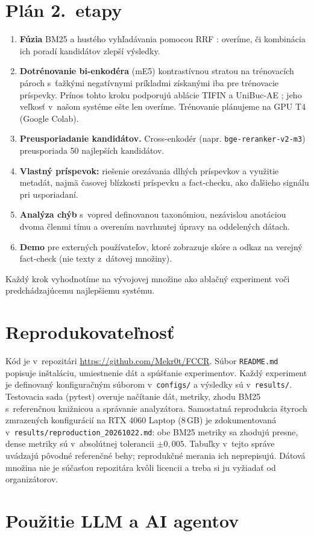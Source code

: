\documentclass[11pt,a4paper]{article}
\begin{document}
\section{Plán 2.~etapy}
\label{sec:plan}

\begin{enumerate}
  \item \textbf{Fúzia} BM25 a hustého vyhľadávania pomocou RRF \citep{cormack-etal-2009-rrf}: overíme, či kombinácia ich poradí kandidátov zlepší výsledky.
  \item \textbf{Dotrénovanie bi-enkodéra} (mE5) kontrastívnou stratou na trénovacích pároch s~ťažkými negatívnymi príkladmi získanými iba pre trénovacie príspevky.
  Prínos tohto kroku podporujú ablácie TIFIN a UniBuc-AE \citep{devadiga-etal-2025-tifin, enache-2025-unibuc}; jeho veľkosť v~našom systéme ešte len overíme.
  Trénovanie plánujeme na GPU T4 (Google Colab).
  \item \textbf{Preusporiadanie kandidátov.} Cross-enkodér (napr. \texttt{bge-\allowbreak reranker-\allowbreak v2-m3}) preusporiada 50 najlepších kandidátov.
  \item \textbf{Vlastný príspevok:} riešenie orezávania dlhých príspevkov a využitie metadát, najmä časovej blízkosti príspevku a fact-checku, ako ďalšieho signálu pri usporiadaní.
  \item \textbf{Analýza chýb} s~vopred definovanou taxonómiou, nezávislou anotáciou dvoma členmi tímu a overením navrhnutej úpravy na oddelených dátach.
  \item \textbf{Demo} pre externých používateľov, ktoré zobrazuje skóre a odkaz na verejný fact-check (nie texty z~dátovej množiny).
\end{enumerate}
Každý krok vyhodnotíme na vývojovej množine ako ablačný experiment voči predchádzajúcemu najlepšiemu systému.

\section{Reprodukovateľnosť}
\label{sec:repro}
Kód je v~repozitári \url{https://github.com/Mekr0t/FCCR}.
Súbor \texttt{README.md} popisuje inštaláciu, umiestnenie dát a spúšťanie experimentov.
Každý experiment je definovaný konfiguračným súborom v~\texttt{configs/} a výsledky sú v~\texttt{results/}.
Testovacia sada (pytest) overuje načítanie dát, metriky, zhodu BM25 s~referenčnou knižnicou a správanie analyzátora.
Samostatná reprodukcia štyroch zmrazených konfigurácií na RTX 4060 Laptop (8\,GB) je zdokumentovaná v~\texttt{results/reproduction\_20261022.md}: obe BM25 metriky sa zhodujú presne, dense metriky sú v~absolútnej tolerancii $\pm 0{,}005$.
Tabuľky v~tejto správe uvádzajú pôvodné referenčné behy; reprodukčné merania ich neprepisujú.
Dátová množina nie je súčasťou repozitára kvôli licencii a treba si ju vyžiadať od organizátorov.



\clearpage
\appendix
\section{Použitie LLM a AI agentov}
\label{app:llm}

\end{document}
